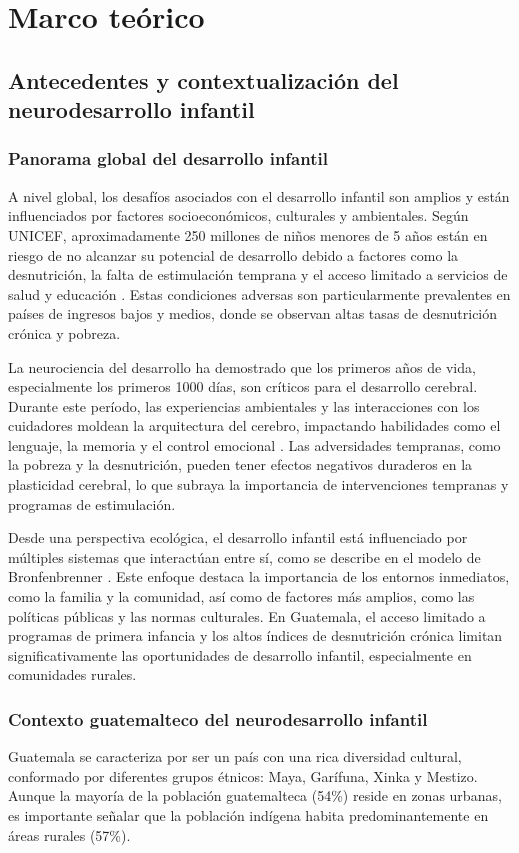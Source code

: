 \documentclass[11pt,letterpaper]{report}
\begin{document}
	\chapter{Marco teórico}
\section{Antecedentes y contextualización del neurodesarrollo infantil}
\subsection{Panorama global del desarrollo infantil}
A nivel global,  los desafíos asociados con el desarrollo infantil son amplios
y están influenciados por factores socioeconómicos, culturales y ambientales.
Según UNICEF, aproximadamente 250 millones de niños menores de 5 años están en 
riesgo de no alcanzar su potencial de desarrollo debido a factores como la 
desnutrición, la falta de estimulación temprana y el acceso limitado a 
servicios de salud y educación \cite{UNICEF2023}. Estas condiciones adversas 
son particularmente prevalentes en países de ingresos bajos y medios, donde se 
observan altas tasas de desnutrición crónica y pobreza.

La neurociencia del desarrollo ha demostrado que los primeros años de vida, 
especialmente los primeros 1000 días, son críticos para el desarrollo cerebral. 
Durante este período, las experiencias ambientales y las interacciones con los 
cuidadores moldean la arquitectura del cerebro, impactando habilidades como el 
lenguaje, la memoria y el control emocional \cite{Stiles2010}. Las adversidades 
tempranas, como la pobreza y la desnutrición, pueden tener efectos negativos 
duraderos en la plasticidad cerebral, lo que subraya la importancia de 
intervenciones tempranas y programas de estimulación.

Desde una perspectiva ecológica, el desarrollo infantil está influenciado por 
múltiples sistemas que interactúan entre sí, como se describe en el modelo de 
Bronfenbrenner \cite{Bronfenbrenner2005}. Este enfoque destaca la importancia 
de los entornos inmediatos, como la familia y la comunidad, así como de 
factores más amplios, como las políticas públicas y las normas culturales. En
Guatemala, el acceso limitado a programas de primera infancia y los altos
índices de desnutrición crónica limitan significativamente las oportunidades de
desarrollo infantil, especialmente en comunidades rurales. \cite{SESAN2022}

\subsection{Contexto guatemalteco del neurodesarrollo infantil}
Guatemala se caracteriza por ser un país con una rica diversidad cultural,
conformado por diferentes grupos étnicos: Maya, Garífuna, Xinka y Mestizo. 
Aunque la mayoría de la población guatemalteca (54\%) reside en zonas urbanas,
es importante señalar que la población indígena habita predominantemente en
áreas rurales (57\%). \cite{PoliticaInfanciaGuate}
\end{document}
